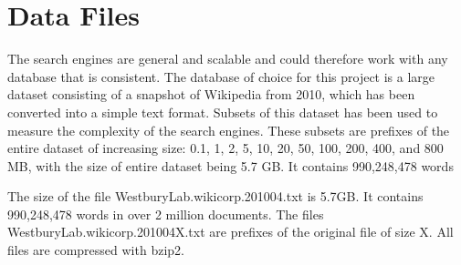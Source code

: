 \section{Data Files}

The search engines are general and scalable and could therefore work with any database that is consistent. The database of choice for this project is a large dataset consisting of a snapshot of Wikipedia from 2010, which has been converted into a simple text format. Subsets of this dataset has been used to measure the complexity of the search engines. These subsets are prefixes of the entire dataset of increasing size: 0.1, 1, 2, 5, 10, 20, 50, 100, 200, 400, and 800 MB, with the size of entire dataset being 5.7 GB. It contains 990,248,478 words


The size of the file WestburyLab.wikicorp.201004.txt is 5.7GB. It contains 990,248,478 words in over 2 million documents. The files WestburyLab.wikicorp.201004X.txt are prefixes of the original file of size X. All files are compressed with bzip2. 



